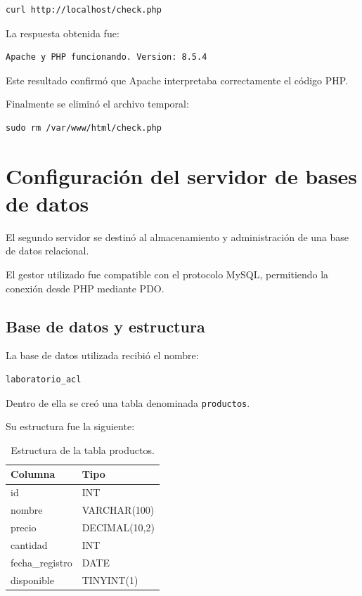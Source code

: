 \documentclass[12pt,a4paper]{article}
\begin{document}
\begin{lstlisting}
curl http://localhost/check.php
\end{lstlisting}

La respuesta obtenida fue:

\begin{lstlisting}
Apache y PHP funcionando. Version: 8.5.4
\end{lstlisting}

Este resultado confirmó que Apache
interpretaba correctamente el código PHP.

Finalmente se eliminó el archivo temporal:

\begin{lstlisting}
sudo rm /var/www/html/check.php
\end{lstlisting}

\section{Configuración del servidor de bases de datos}

El segundo servidor se destinó al
almacenamiento y administración
de una base de datos relacional.

El gestor utilizado fue compatible
con el protocolo MySQL, permitiendo
la conexión desde PHP mediante PDO.

\subsection{Base de datos y estructura}

La base de datos utilizada recibió
el nombre:

\begin{lstlisting}
laboratorio_acl
\end{lstlisting}

Dentro de ella se creó una tabla
denominada \texttt{productos}.

Su estructura fue la siguiente:

\begin{table}[H]
\centering
\begin{tabular}{|l|l|}
\hline
\textbf{Columna} & \textbf{Tipo} \\
\hline
id & INT \\
\hline
nombre & VARCHAR(100) \\
\hline
precio & DECIMAL(10,2) \\
\hline
cantidad & INT \\
\hline
fecha\_registro & DATE \\
\hline
disponible & TINYINT(1) \\
\hline
\end{tabular}
\caption{Estructura de la tabla productos.}
\end{table}
\end{document}
